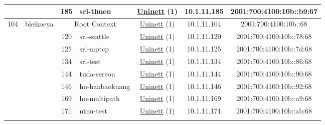\begin{small}
\begin{center}
\begin{longtable}{|c|c|c|c|c|c|c|c|}
  &  & \tiny{185} & \multicolumn{1}{|l|}{\tiny{srl-thuen}} & \multicolumn{2}{|c|}{\tiny{\href{https://www.uninett.no}{Uninett} (1)}} & \tiny{10.1.11.185} & \tiny{2001:700:4100:10b::b9:67} \\ \hline
 \multirow{11}{*}{\tiny{104}} & \multicolumn{1}{|l|}{\multirow{11}{*}{\tiny{bleikoeya}}} & \multicolumn{2}{|c|}{\tiny{Root Context}} & \multicolumn{2}{|c|}{\tiny{\href{https://www.uninett.no}{Uninett} (1)}} & \tiny{10.1.11.104} & \tiny{2001:700:4100:10b::68} \\* \cline{3-3}\cline{4-4}\cline{5-5}\cline{6-6}\cline{7-7}\cline{8-8}
  &  & \tiny{120} & \multicolumn{1}{|l|}{\tiny{srl-seattle}} & \multicolumn{2}{|c|}{\tiny{\href{https://www.uninett.no}{Uninett} (1)}} & \tiny{10.1.11.120} & \tiny{2001:700:4100:10b::78:68} \\* \cline{3-3}\cline{4-4}\cline{5-5}\cline{6-6}\cline{7-7}\cline{8-8}
  &  & \tiny{125} & \multicolumn{1}{|l|}{\tiny{srl-mptcp}} & \multicolumn{2}{|c|}{\tiny{\href{https://www.uninett.no}{Uninett} (1)}} & \tiny{10.1.11.125} & \tiny{2001:700:4100:10b::7d:68} \\* \cline{3-3}\cline{4-4}\cline{5-5}\cline{6-6}\cline{7-7}\cline{8-8}
  &  & \tiny{134} & \multicolumn{1}{|l|}{\tiny{srl-test}} & \multicolumn{2}{|c|}{\tiny{\href{https://www.uninett.no}{Uninett} (1)}} & \tiny{10.1.11.134} & \tiny{2001:700:4100:10b::86:68} \\* \cline{3-3}\cline{4-4}\cline{5-5}\cline{6-6}\cline{7-7}\cline{8-8}
  &  & \tiny{144} & \multicolumn{1}{|l|}{\tiny{tuda-sereon}} & \multicolumn{2}{|c|}{\tiny{\href{https://www.uninett.no}{Uninett} (1)}} & \tiny{10.1.11.144} & \tiny{2001:700:4100:10b::90:68} \\* \cline{3-3}\cline{4-4}\cline{5-5}\cline{6-6}\cline{7-7}\cline{8-8}
  &  & \tiny{146} & \multicolumn{1}{|l|}{\tiny{hu-hanbaokuang}} & \multicolumn{2}{|c|}{\tiny{\href{https://www.uninett.no}{Uninett} (1)}} & \tiny{10.1.11.146} & \tiny{2001:700:4100:10b::92:68} \\* \cline{3-3}\cline{4-4}\cline{5-5}\cline{6-6}\cline{7-7}\cline{8-8}
  &  & \tiny{169} & \multicolumn{1}{|l|}{\tiny{hu-multipath}} & \multicolumn{2}{|c|}{\tiny{\href{https://www.uninett.no}{Uninett} (1)}} & \tiny{10.1.11.169} & \tiny{2001:700:4100:10b::a9:68} \\* \cline{3-3}\cline{4-4}\cline{5-5}\cline{6-6}\cline{7-7}\cline{8-8}
  &  & \tiny{171} & \multicolumn{1}{|l|}{\tiny{ntnu-test}} & \multicolumn{2}{|c|}{\tiny{\href{https://www.uninett.no}{Uninett} (1)}} & \tiny{10.1.11.171} & \tiny{2001:700:4100:10b::ab:68} \\* \cline{3-3}\cline{4-4}\cline{5-5}\cline{6-6}\cline{7-7}\cline{8-8}

\end{longtable}
\end{center}
\end{small}
